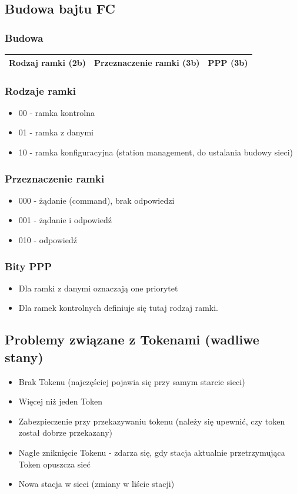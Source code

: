 \documentclass[a4paper,twoside]{article}
\begin{document}
		\subsection{Budowa bajtu FC}
			\subsubsection{Budowa}
			\begin{tabular}{|c|c|c|}
				\hline Rodzaj ramki (2b) & Przeznaczenie ramki (3b) & PPP (3b) \\ 
				\hline 
			\end{tabular} 
			\subsubsection{Rodzaje ramki}
			\begin{itemize}
				\item 00 - ramka kontrolna
				\item 01 - ramka  z danymi
				\item 10 - ramka konfiguracyjna (station management, do ustalania budowy sieci)
			\end{itemize}
			\subsubsection{Przeznaczenie ramki}
			\begin{itemize}
				\item 000 - żądanie (command), brak odpowiedzi
				\item 001 - żądanie i odpowiedź
				\item 010 - odpowiedź
			\end{itemize}
			\subsubsection{Bity PPP}
			\begin{itemize}
				\item Dla ramki z danymi oznaczają one priorytet
				\item Dla ramek kontrolnych definiuje się tutaj rodzaj ramki. 
			\end{itemize}
		\subsection{Problemy związane z Tokenami (wadliwe stany)}
		\begin{itemize}
			\item Brak Tokenu (najczęściej pojawia się przy samym starcie sieci) 
			\item Więcej niż jeden Token
			\item Zabezpieczenie przy przekazywaniu tokenu (należy się upewnić, czy token został dobrze przekazany)
			\item Nagłe zniknięcie Tokenu - zdarza się, gdy stacja aktualnie przetrzymująca Token opuszcza sieć
			\item Nowa stacja w sieci (zmiany w liście stacji)
		\end{itemize}
\end{document}
